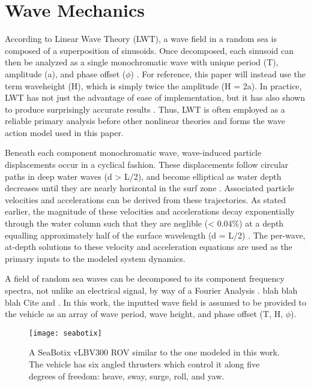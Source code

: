 \documentclass[letterpaper, 10pt, conference]{IEEEtran}
\begin{document}
\section{Wave Mechanics} 
\label{sec:waves}

According to Linear Wave Theory (LWT), a wave field in a random sea is composed of a superposition of sinusoids. Once decomposed, each sinusoid can then be analyzed as a single monochromatic wave with unique period (T), amplitude (a), and phase offset ($\phi$) \cite{D&D,phillips}. For reference, this paper will instead use the term waveheight (H), which is simply twice the amplitude (H = 2a). In practice, LWT has not just the advantage of ease of implementation, but it has also shown to produce surprisingly accurate results \cite{D&D}. Thus, LWT is often employed as a reliable primary analysis before other nonlinear theories and forms the wave action model used in this paper.

Beneath each component monochromatic wave, wave-induced particle displacements occur in a cyclical fashion. These displacements follow circular paths in deep water waves (d > L/2), and become elliptical as water depth decreases until they are nearly horizontal in the surf zone \cite{D&D}. Associated particle velocities and accelerations can be derived from these trajectories. As stated earlier, the magnitude of these velocities and accelerations decay exponentially through the water column such that they are neglible (< 0.04\%) at a depth equalling approximately half of the surface wavelength (d = L/2) \cite{D&D}. The per-wave, at-depth solutions to these velocity and acceleration equations are used as the primary inputs to the modeled system dynamics.

A field of random sea waves can be decomposed to its component frequency spectra, not unlike an electrical signal, by way of a Fourier Analysis \cite{goda}. blah blah blah Cite \cite{falnes} and \cite{ling}. In this work, the inputted wave field is assumed to be provided to the vehicle as an array of wave period, wave height, and phase offset (T, H, $\phi$). 

\begin{figure}
\texttt{[image: seabotix]}
\centering
\caption{A SeaBotix vLBV300 ROV similar to the one modeled in this work. The vehicle has six angled thrusters which control it along five degrees of freedom: heave, sway, surge, roll, and yaw.}
\centering
\label{fig:seabotix}
\end{figure}
\end{document}
